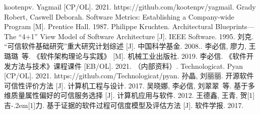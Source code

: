 \documentclass[UTF8,12pt,a4paper]{ctexart}
\begin{document}
    
\begin{thebibliography}{99}
\setlength{\itemsep}{-1.5mm}
 kootenpv. Yagmail [CP/OL]. 2021. https://github.com/kootenpv/yagmail.
 Grady Robert, Caswell Deborah. Software Metrics: Establishing a Company-wide Program [M]. Prentice Hall. 1987.
 Philippe Kruchten. Architectural Blueprints—The “4+1” View Model of Software Architecture [J]. IEEE Software. 1995.
 刘克. “可信软件基础研究”重大研究计划综述 [J]. 中国科学基金. 2008..
 李必信, 廖力, 王璐璐~等. 《软件架构理论与实践》 [M]. 机械工业出版社. 2019.
 李必信. 《软件开发方法与技术》课程课件 [EB/OL]. 2021. （内部资料）.
 Technologicat. Pyan [CP/OL]. 2021. https://github.com/Technologicat/pyan.
 孙晶, 刘丽丽. 开源软件可信性评价方法 [J]. 计算机工程与设计. 2017.
 吴晓娜, 李必信, 刘翠翠~等. 基于多维质量属性偏好的可信服务选择 [J]. 计算机应用与软件. 2012.
 王德鑫, 王青, 贺\hbox{\scalebox{0.6}[1]{吉}\kern-.2em\scalebox{0.6}[1]{力}}.  基于证据的软件过程可信度模型及评估方法 [J]. 软件学报. 2017.

\end{thebibliography}
\end{document}
